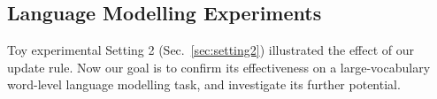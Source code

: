 \documentclass{article}
\theoremstyle{definition}
\begin{document}
\begin{table}[h]



\end{table}

\subsection{Language Modelling Experiments}
\label{sec:lm}
Toy experimental Setting 2 (Sec.~\ref{sec:setting2}) illustrated
the effect of our update rule.
Now our goal is to confirm its effectiveness
on a large-vocabulary word-level language modelling task,
and investigate its further potential.
\end{document}
